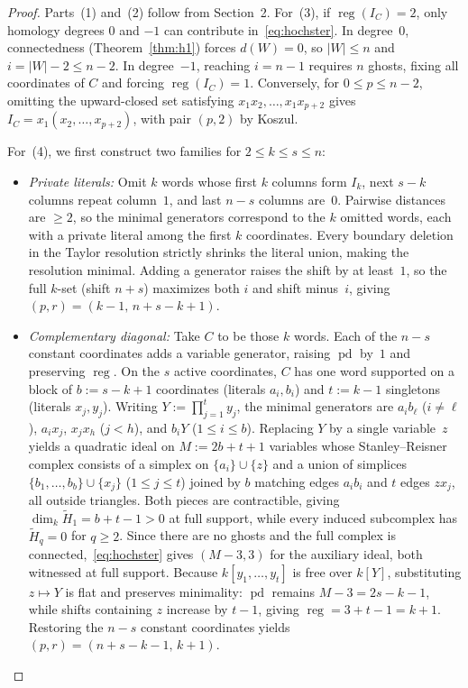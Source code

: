 \documentclass[11pt]{article}
\theoremstyle{plain}
\theoremstyle{definition}
\theoremstyle{remark}
\DeclareMathOperator{\pd}{pd}
\DeclareMathOperator{\reg}{reg}
\begin{document}
\begin{proof}
Parts~(1) and~(2) follow from Section~2. For~(3), if $\reg(I_C) = 2$, only homology degrees $0$ and $-1$ can contribute in~\eqref{eq:hochster}. In degree~$0$, connectedness (Theorem~\ref{thm:h1}) forces $d(W) = 0$, so $|W| \le n$ and $i = |W|-2 \le n-2$. In degree~$-1$, reaching $i = n-1$ requires $n$ ghosts, fixing all coordinates of $C$ and forcing $\reg(I_C) = 1$. Conversely, for $0 \le p \le n-2$, omitting the upward-closed set satisfying $x_1 x_2, \dots, x_1 x_{p+2}$ gives $I_C = x_1(x_2,\dots,x_{p+2})$, with pair $(p,2)$ by Koszul.

For~(4), we first construct two families for $2 \le k \le s \le n$:
\begin{itemize}[leftmargin=*]
\item \emph{Private literals:} Omit $k$ words whose first $k$ columns form $I_k$, next $s-k$ columns repeat column~$1$, and last $n-s$ columns are~$0$. Pairwise distances are $\ge 2$, so the minimal generators correspond to the $k$ omitted words, each with a private literal among the first $k$ coordinates. Every boundary deletion in the Taylor resolution strictly shrinks the literal union, making the resolution minimal. Adding a generator raises the shift by at least~$1$, so the full $k$-set (shift $n+s$) maximizes both $i$ and shift minus~$i$, giving $(p,r) = (k-1,\, n+s-k+1)$.
\item \emph{Complementary diagonal:} Take $C$ to be those $k$ words. Each of the $n-s$ constant coordinates adds a variable generator, raising $\pd$ by~$1$ and preserving $\reg$. On the $s$ active coordinates, $C$ has one word supported on a block of $b := s-k+1$ coordinates (literals $a_i,b_i$) and $t := k-1$ singletons (literals $x_j,y_j$). Writing $Y := \prod_{j=1}^t y_j$, the minimal generators are $a_i b_\ell$ ($i \neq \ell$), $a_i x_j$, $x_j x_h$ ($j < h$), and $b_i Y$ ($1 \le i \le b$). Replacing $Y$ by a single variable~$z$ yields a quadratic ideal on $M := 2b+t+1$ variables whose Stanley--Reisner complex consists of a simplex on $\{a_i\}\cup\{z\}$ and a union of simplices $\{b_1,\dots,b_b\}\cup\{x_j\}$ ($1 \le j \le t$) joined by $b$ matching edges $a_i b_i$ and $t$ edges $z x_j$, all outside triangles. Both pieces are contractible, giving $\dim_k \widetilde{H}_1 = b+t-1 > 0$ at full support, while every induced subcomplex has $\widetilde{H}_q = 0$ for $q \ge 2$. Since there are no ghosts and the full complex is connected,~\eqref{eq:hochster} gives $(M-3, 3)$ for the auxiliary ideal, both witnessed at full support. Because $k[y_1,\dots,y_t]$ is free over $k[Y]$, substituting $z \mapsto Y$ is flat and preserves minimality: $\pd$ remains $M-3 = 2s-k-1$, while shifts containing $z$ increase by $t-1$, giving $\reg = 3 + t - 1 = k+1$. Restoring the $n-s$ constant coordinates yields $(p,r) = (n+s-k-1,\, k+1)$.
\end{itemize}


\end{proof}
\end{document}
